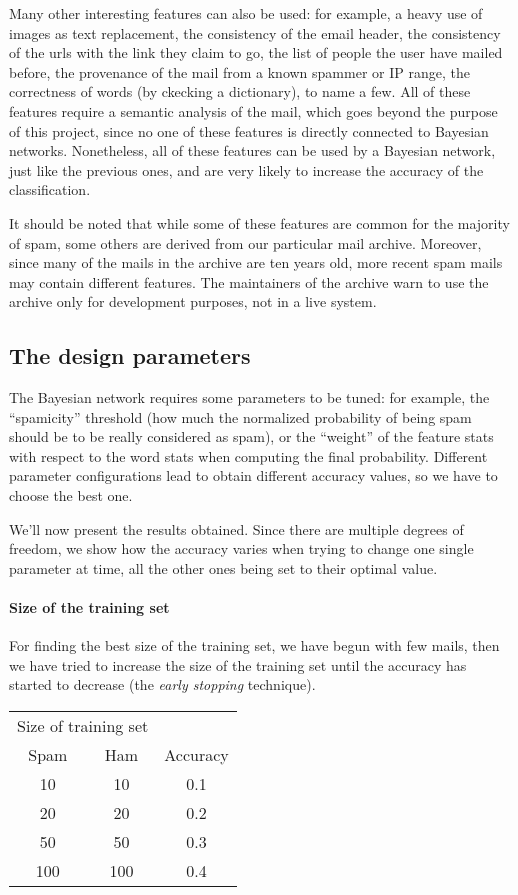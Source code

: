 Many other interesting features can also be used: for example, a heavy use of images as text replacement, the consistency of the email header, the consistency of the urls with the link they claim to go, the list of people the user have mailed before, the provenance of the mail from a known spammer or IP range, the correctness of words (by ckecking a dictionary), to name a few. All of these features require a semantic analysis of the mail, which goes beyond the purpose of this project, since no one of these features is directly connected to Bayesian networks. Nonetheless, all of these features can be used by a Bayesian network, just like the previous ones, and are very likely to increase the accuracy of the classification.

It should be noted that while some of these features are common for the majority of spam, some others are derived from our particular mail archive. Moreover, since many of the mails in the archive are ten years old, more recent spam mails may contain different features. The maintainers of the archive warn to use the archive only for development purposes, not in a live system.

\subsection{The design parameters}
The Bayesian network requires some parameters to be tuned: for example, the ``spamicity'' threshold (how much the normalized probability of being spam should be to be really considered as spam), or the ``weight'' of the feature stats with respect to the word stats when computing the final probability. Different parameter configurations lead to obtain different accuracy values, so we have to choose the best one.

We'll now present the results obtained. Since there are multiple degrees of freedom, we show how the accuracy varies when trying to change one single parameter at time, all the other ones being set to their optimal value.

\paragraph{Size of the training set}
For finding the best size of the training set, we have begun with few mails, then we have tried to increase the size of the training set until the accuracy has started to decrease (the \textit{early stopping} technique).

\begin{center}
\begin{tabular}{ccc}
\toprule
\multicolumn{2}{c}{Size of training set} \\
\cmidrule(r){1-2}
Spam & Ham & Accuracy \\
\midrule
10  & 10    & 0.1 \\
20  & 20    & 0.2 \\
50  & 50    & 0.3 \\
100 & 100   & 0.4 \\
\bottomrule
\end{tabular}
\end{center}

